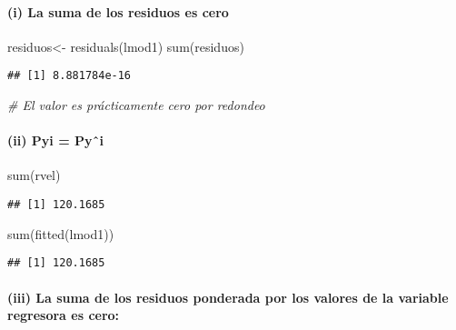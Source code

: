 \documentclass[
]{article}
\newenvironment{Shaded}{\begin{snugshade}}{\end{snugshade}}
\newcommand{\CommentTok}[1]{\textcolor[rgb]{0.56,0.35,0.01}{\textit{#1}}}
\newcommand{\FunctionTok}[1]{\textcolor[rgb]{0.00,0.00,0.00}{#1}}
\newcommand{\NormalTok}[1]{#1}
\newcommand{\OtherTok}[1]{\textcolor[rgb]{0.56,0.35,0.01}{#1}}
\begin{document}
\hypertarget{i-la-suma-de-los-residuos-es-cero}{%
\paragraph{(i) La suma de los residuos es
cero}\label{i-la-suma-de-los-residuos-es-cero}}

\begin{Shaded}
\begin{Highlighting}[]
\NormalTok{residuos}\OtherTok{\textless{}{-}} \FunctionTok{residuals}\NormalTok{(lmod1)}
\FunctionTok{sum}\NormalTok{(residuos)}
\end{Highlighting}
\end{Shaded}

\begin{verbatim}
## [1] 8.881784e-16
\end{verbatim}

\begin{Shaded}
\begin{Highlighting}[]
\CommentTok{\# El valor es prácticamente cero por redondeo}
\end{Highlighting}
\end{Shaded}

\hypertarget{ii-pyi-pyux2c6i}{%
\paragraph{(ii) Pyi = Pyˆi}\label{ii-pyi-pyux2c6i}}

\begin{Shaded}
\begin{Highlighting}[]
\FunctionTok{sum}\NormalTok{(rvel)}
\end{Highlighting}
\end{Shaded}

\begin{verbatim}
## [1] 120.1685
\end{verbatim}

\begin{Shaded}
\begin{Highlighting}[]
\FunctionTok{sum}\NormalTok{(}\FunctionTok{fitted}\NormalTok{(lmod1))}
\end{Highlighting}
\end{Shaded}

\begin{verbatim}
## [1] 120.1685
\end{verbatim}

\hypertarget{iii-la-suma-de-los-residuos-ponderada-por-los-valores-de-la-variable-regresora-es-cero}{%
\paragraph{(iii) La suma de los residuos ponderada por los valores de la
variable regresora es
cero:}\label{iii-la-suma-de-los-residuos-ponderada-por-los-valores-de-la-variable-regresora-es-cero}}
\end{document}
